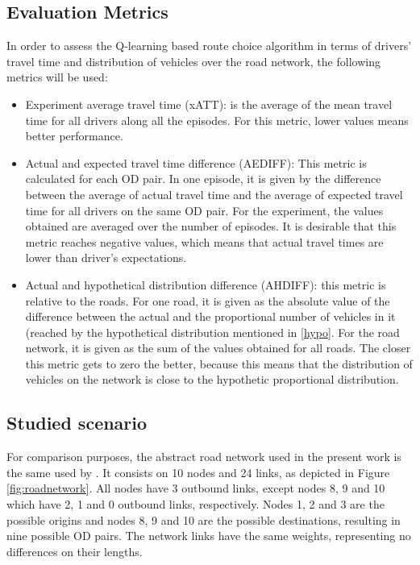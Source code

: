 \documentclass[12pt]{article}
\begin{document}
\subsection{Evaluation Metrics}
In order to assess the Q-learning based route choice algorithm in terms of drivers' travel time and distribution of vehicles over the road network, the following metrics will be used: %

\begin{itemize}
	\item Experiment average travel time (xATT): is the average of the mean travel time for all drivers along all the episodes. For this metric, lower values means better performance.
	\item Actual and expected travel time difference (AEDIFF): This metric is calculated for each OD pair. In one episode, it is given by the difference between the average of actual travel time and the average of expected travel time for all drivers on the same OD pair. For the experiment, the values obtained are averaged over the number of episodes. It is desirable that this metric reaches negative values, which means that actual travel times are lower than driver's expectations.
	\item Actual and hypothetical distribution difference (AHDIFF): this metric is relative to the roads. For one road, it is given as the absolute value of the difference between the actual and the proportional number of vehicles in it (reached by the hypothetical distribution mentioned in \ref{hypo}. For the road network, it is given as the sum of the values obtained for all roads. The closer this metric gets to zero the better, because this means that the distribution of vehicles on the network is close to the hypothetic proportional distribution.
\end{itemize}

\subsection{Studied scenario}

For comparison purposes, the abstract road network used in the present work is the same used by \cite{Galib&Moser2011}. It consists on 10 nodes and 24 links, as depicted in Figure \ref{fig:roadnetwork}. All nodes have 3 outbound links, except nodes 8, 9 and 10 which have 2, 1 and 0 outbound links, respectively. Nodes 1, 2 and 3 are the possible origins and nodes 8, 9 and 10 are the possible destinations, resulting in nine possible OD pairs. The network links have the same weights, representing no differences on their lengths.
\end{document}
